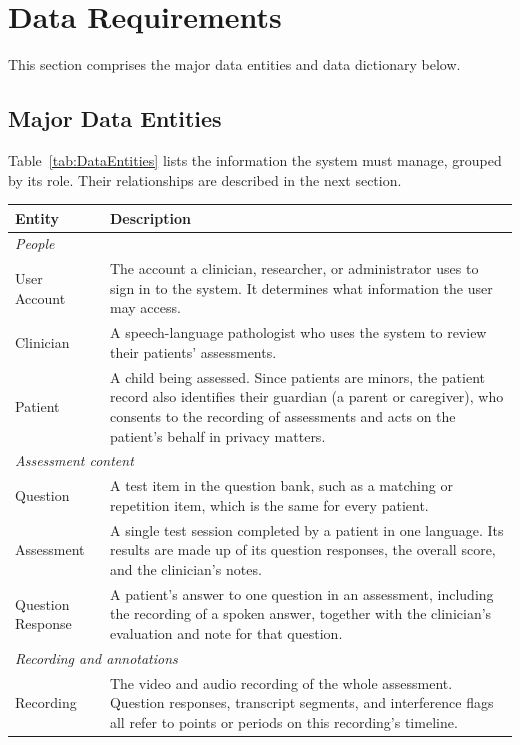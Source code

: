 \documentclass[12pt]{article}
\begin{document}

\section{Data Requirements} \label{sec:DataRequirements}
This section comprises the major data entities and data dictionary below.

\subsection{Major Data Entities}

Table~\ref{tab:DataEntities} lists the information the system must manage, grouped by its role. Their relationships are described in the next section.

\begin{longtable}{p{} p{}}
\toprule
Entity & Description\\
\midrule
\endhead
\multicolumn{2}{l}{\textit{People}}\\
\midrule
User Account & The account a clinician, researcher, or administrator uses to sign in to the system. It determines what information the user may access.\\
Clinician & A speech-language pathologist who uses the system to review their patients’ assessments.\\
Patient & A child being assessed. Since patients are minors, the patient record also identifies their guardian (a parent or caregiver), who consents to the recording of assessments and acts on the patient’s behalf in privacy matters.\\
\midrule
\multicolumn{2}{l}{\textit{Assessment content}}\\
\midrule
Question & A test item in the question bank, such as a matching or repetition item, which is the same for every patient.\\
Assessment & A single test session completed by a patient in one language. Its results are made up of its question responses, the overall score, and the clinician’s notes.\\
Question Response & A patient’s answer to one question in an assessment, including the recording of a spoken answer, together with the clinician’s evaluation and note for that question.\\
\midrule
\multicolumn{2}{l}{\textit{Recording and annotations}}\\
\midrule
Recording & The video and audio recording of the whole assessment. Question responses, transcript segments, and interference flags all refer to points or periods on this recording’s timeline.\\

\end{longtable}
\end{document}
